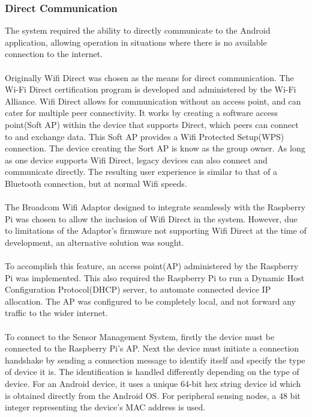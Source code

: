 \documentclass{article}
\begin{document}
\subsubsection{Direct Communication}
\label{sssec:sms_direct_comm}
The system required the ability to directly communicate to the Android application, allowing operation in situations where there is no available connection to the internet.\\\\
Originally Wifi Direct was chosen as the means for direct communication. The Wi-Fi Direct certification program is developed and administered by the Wi-Fi Alliance.
Wifi Direct allows for communication without an access point, and can cater for multiple peer connectivity. It works by creating a software access point(Soft AP) within the device that supports Direct, which peers can connect to and exchange data.  This Soft AP provides a Wifi Protected Setup(WPS) connection. The device creating the Sort AP is know as the group owner. As long as one device supports Wifi Direct, legacy devices can also connect and communicate directly. The resulting user experience is similar to that of a Bluetooth connection, but at normal Wifi speeds.\\\\
The Broadcom Wifi Adaptor designed to integrate seamlessly with the Raspberry Pi was chosen to allow the inclusion of Wifi Direct in the system. However, due to limitations of the Adaptor\rq s firmware not supporting Wifi Direct at the time of development, an alternative solution was sought. \\\\
To accomplish this feature, an access point(AP) administered by the Raspberry Pi was implemented. This also required the Raspberry Pi to run a Dynamic Host Configuration Protocol(DHCP) server, to automate connected device IP allocation. The AP was configured to be completely local, and not forward any traffic to the wider internet. \\\\
To connect to the Sensor Management System, firstly the device must be connected to the Raspberry Pi\rq s AP. Next the device must initiate a connection handshake by sending a connection message to identify itself and specify the type of device it is. The identification is handled differently depending on the type of device. For an Android device, it uses a unique 64-bit hex string device id which is obtained directly from the Android OS. For peripheral sensing nodes, a 48 bit integer representing the device\rq s MAC address is used. \\\\
\end{document}
